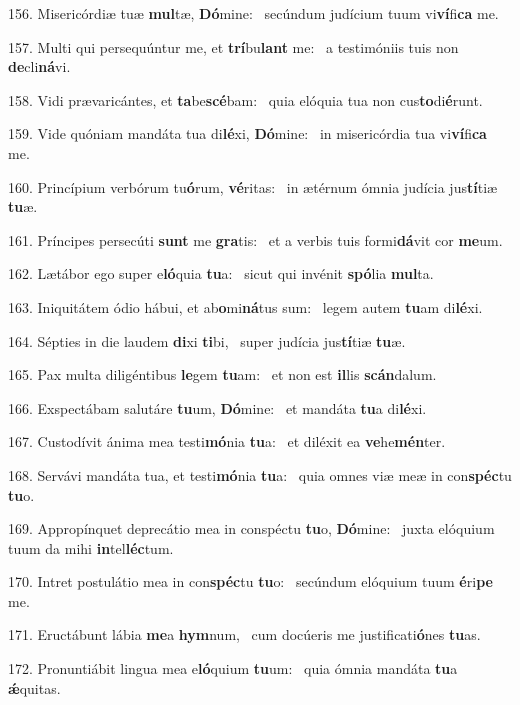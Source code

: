 156. Misericórdiæ tuæ \textbf{mul}tæ, \textbf{Dó}mine: \ast\  secúndum judícium tuum vi\textbf{ví}fi\textbf{ca} me.\

157. Multi qui persequúntur me, et \textbf{trí}bu\textbf{lant} me: \ast\  a testimóniis tuis non \textbf{de}cli\textbf{ná}vi.\

158. Vidi prævaricántes, et \textbf{ta}be\textbf{scé}bam: \ast\  quia elóquia tua non cus\textbf{to}di\textbf{é}runt.\

159. Vide quóniam mandáta tua di\textbf{lé}xi, \textbf{Dó}mine: \ast\  in misericórdia tua vi\textbf{ví}fi\textbf{ca} me.\

160. Princípium verbórum tu\textbf{ó}rum, \textbf{vé}ritas: \ast\  in ætérnum ómnia judícia jus\textbf{tí}tiæ \textbf{tu}æ.\

161. Príncipes persecúti \textbf{sunt} me \textbf{gra}tis: \ast\  et a verbis tuis formi\textbf{dá}vit cor \textbf{me}um.\

162. Lætábor ego super e\textbf{ló}quia \textbf{tu}a: \ast\  sicut qui invénit \textbf{spó}lia \textbf{mul}ta.\

163. Iniquitátem ódio hábui, et ab\textbf{o}mi\textbf{ná}tus sum: \ast\  legem autem \textbf{tu}am di\textbf{lé}xi.\

164. Sépties in die laudem \textbf{di}xi \textbf{ti}bi, \ast\  super judícia jus\textbf{tí}tiæ \textbf{tu}æ.\

165. Pax multa diligéntibus \textbf{le}gem \textbf{tu}am: \ast\  et non est \textbf{il}lis \textbf{scán}dalum.\

166. Exspectábam salutáre \textbf{tu}um, \textbf{Dó}mine: \ast\  et mandáta \textbf{tu}a di\textbf{lé}xi.\

167. Custodívit ánima mea testi\textbf{mó}nia \textbf{tu}a: \ast\  et diléxit ea \textbf{ve}he\textbf{mén}ter.\

168. Servávi mandáta tua, et testi\textbf{mó}nia \textbf{tu}a: \ast\  quia omnes viæ meæ in con\textbf{spéc}tu \textbf{tu}o.\

169. Appropínquet deprecátio mea in conspéctu \textbf{tu}o, \textbf{Dó}mine: \ast\  juxta elóquium tuum da mihi \textbf{in}tel\textbf{léc}tum.\

170. Intret postulátio mea in con\textbf{spéc}tu \textbf{tu}o: \ast\  secúndum elóquium tuum \textbf{é}ri\textbf{pe} me.\

171. Eructábunt lábia \textbf{me}a \textbf{hym}num, \ast\  cum docúeris me justificati\textbf{ó}nes \textbf{tu}as.\

172. Pronuntiábit lingua mea e\textbf{ló}quium \textbf{tu}um: \ast\  quia ómnia mandáta \textbf{tu}a \textbf{ǽ}quitas.\

